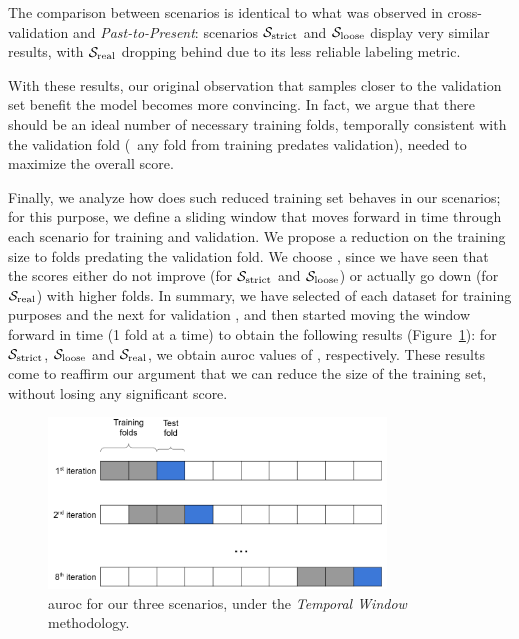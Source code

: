 The comparison between scenarios is identical to what was observed in cross-validation and \textit{Past-to-Present}: scenarios $\mathcal{S}_{\mathrm{strict}}$ and $\mathcal{S}_{\mathrm{loose}}$ display very similar results, with $\mathcal{S}_{\mathrm{real}}$ dropping behind due to its less reliable labeling metric.

With these results, our original observation that samples closer to the validation set benefit the model becomes more convincing. In fact, we argue that there should be an ideal number of necessary training folds, temporally consistent with the validation fold (\ie\ any fold from training predates validation), needed to maximize the overall score.

\medskip

Finally, we analyze how does such reduced training set behaves in our scenarios; for this purpose, we define a sliding window that moves forward in time through each scenario for training and validation.
We propose a reduction on the training size to  folds predating the validation fold. We choose , since we have seen that the scores either do not improve (for $\mathcal{S}_{\mathrm{strict}}$ and $\mathcal{S}_{\mathrm{loose}}$) or actually go down (for $\mathcal{S}_{\mathrm{real}}$) with higher folds.
In summary, we have selected  of each dataset for training purposes and the next  for validation , and then started moving the window forward in time (1 fold at a time) to obtain the following results (Figure~\ref{fig:slidingwindow}): for  $\mathcal{S}_{\mathrm{strict}}$, $\mathcal{S}_{\mathrm{loose}}$ and $\mathcal{S}_{\mathrm{real}}$, we obtain \gls{auroc} values of , respectively. 
These results come to reaffirm our argument that we can reduce the size of the training set, without losing any significant score.

\begin{figure}[!h]
	\centering
	\includegraphics[width=0.8\textwidth]{Figures/dia_slidingwindow.png}
	\caption[Single layer results for static features in \textit{Temporal Window}.]{\gls{auroc} for our three scenarios, under the \textit{Temporal Window} methodology.}
	\label{fig:slidingwindow}
\end{figure}

